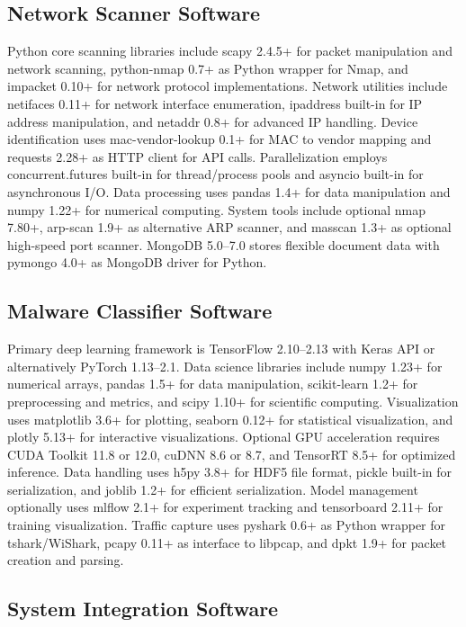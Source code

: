 \subsection{Network Scanner Software}

Python core scanning libraries include scapy 2.4.5+ for packet manipulation and network scanning, python-nmap 0.7+ as Python wrapper for Nmap, and impacket 0.10+ for network protocol implementations. Network utilities include netifaces 0.11+ for network interface enumeration, ipaddress built-in for IP address manipulation, and netaddr 0.8+ for advanced IP handling. Device identification uses mac-vendor-lookup 0.1+ for MAC to vendor mapping and requests 2.28+ as HTTP client for API calls. Parallelization employs concurrent.futures built-in for thread/process pools and asyncio built-in for asynchronous I/O. Data processing uses pandas 1.4+ for data manipulation and numpy 1.22+ for numerical computing. System tools include optional nmap 7.80+, arp-scan 1.9+ as alternative ARP scanner, and masscan 1.3+ as optional high-speed port scanner. MongoDB 5.0--7.0 stores flexible document data with pymongo 4.0+ as MongoDB driver for Python.

\subsection{Malware Classifier Software}

Primary deep learning framework is TensorFlow 2.10--2.13 with Keras API or alternatively PyTorch 1.13--2.1. Data science libraries include numpy 1.23+ for numerical arrays, pandas 1.5+ for data manipulation, scikit-learn 1.2+ for preprocessing and metrics, and scipy 1.10+ for scientific computing. Visualization uses matplotlib 3.6+ for plotting, seaborn 0.12+ for statistical visualization, and plotly 5.13+ for interactive visualizations. Optional GPU acceleration requires CUDA Toolkit 11.8 or 12.0, cuDNN 8.6 or 8.7, and TensorRT 8.5+ for optimized inference. Data handling uses h5py 3.8+ for HDF5 file format, pickle built-in for serialization, and joblib 1.2+ for efficient serialization. Model management optionally uses mlflow 2.1+ for experiment tracking and tensorboard 2.11+ for training visualization. Traffic capture uses pyshark 0.6+ as Python wrapper for tshark/WiShark, pcapy 0.11+ as interface to libpcap, and dpkt 1.9+ for packet creation and parsing.

\subsection{System Integration Software}

